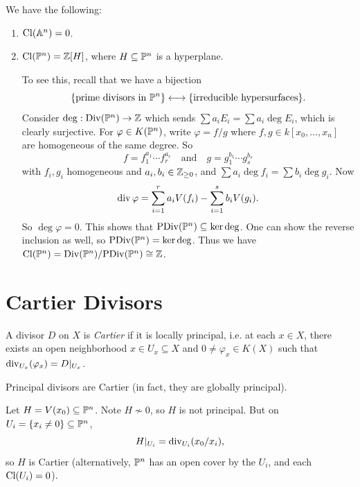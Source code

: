 \begin{example}
  We have the following:
  \begin{enumerate}
    \item $\operatorname{Cl}(\mathbb{A}^n) = 0$.
    \item $\operatorname{Cl}(\mathbb{P}^n) = \mathbb{Z}[H]$, where
      $H \subseteq \mathbb{P}^n$ is a hyperplane.

      To see this, recall that we have
      a bijection
      \[
        \{\text{prime divisors in $\mathbb{P}^n$}\}
        \longleftrightarrow
        \{\text{irreducible hypersurfaces}\}.
      \]
      Consider $\deg : \operatorname{Div}(\mathbb{P}^n) \to \mathbb{Z}$
      which sends
      $\sum a_i E_i = \sum a_i \deg E_i$,
      which is clearly surjective. For
      $\varphi \in K(\mathbb{P}^n)$, write
      $\varphi = f / g$ where
      $f, g \in k[x_0, \dots, x_n]$
      are homogeneous of the same degree.
      So
      \[
        f = f_1^{a_1} \cdots f_r^{a_r}
        \quad\text{and}\quad
        g = g_1^{b_1} \cdots g_s^{b_s}
      \]
      with $f_i, g_i$ homogeneous and
      $a_i, b_i \in \mathbb{Z}_{\ge 0}$, and
      $\sum a_i \deg f_i = \sum b_i \deg g_i$.
      Now
      \[
        \operatorname{div} \varphi
        = \sum_{i = 1}^r a_i V(f_i)
        - \sum_{i = 1}^s b_i V(g_i).
      \]
      So $\deg \varphi = 0$.
      This shows that
      $\operatorname{PDiv}(\mathbb{P}^n) \subseteq \ker \deg$.
      One can show the reverse inclusion as well,
      so $\operatorname{PDiv}(\mathbb{P}^n) = \ker \deg$.
      Thus we have
      $\operatorname{Cl}(\mathbb{P}^n) = \operatorname{Div}(\mathbb{P}^n) / {\operatorname{PDiv}(\mathbb{P}^n)} \cong \mathbb{Z}$.
  \end{enumerate}
\end{example}

\section{Cartier Divisors}

\begin{definition}
  A divisor $D$ on $X$ is \emph{Cartier}
  if it is locally principal, i.e. at
  each $x \in X$, there exists an open
  neighborhood $x \in U_x \subseteq X$
  and $0 \ne \varphi_x \in K(X)$ such that
  $\operatorname{div}_{U_x}(\varphi_x) = D|_{U_x}$.
\end{definition}

\begin{example}
  Principal divisors are Cartier
  (in fact, they are globally principal).
\end{example}

\begin{example}
  Let $H = V(x_0) \subseteq \mathbb{P}^n$.
  Note $H \nsim 0$, so
  $H$ is not principal. But on
  $U_i = \{x_i \ne 0\} \subseteq \mathbb{P}^n$,
  \[
    H|_{U_i} = \operatorname{div}_{U_i}(x_0 / x_i),
  \]
  so $H$ is Cartier (alternatively,
  $\mathbb{P}^n$ has an open cover by the $U_i$,
  and each $\operatorname{Cl}(U_i) = 0$).
\end{example}

